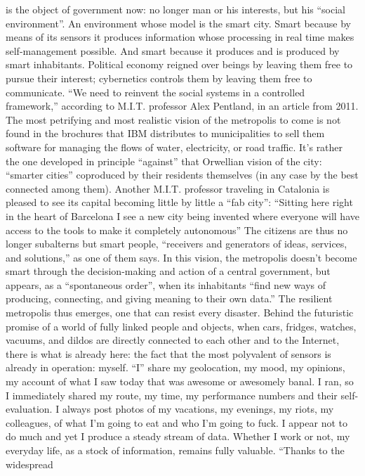\documentclass[landscape,twocolumn,letterpaper]{article}
\begin{document}
is the object of government now: no longer man or his interests, but
his “social environment”. An environment whose model is the smart
city. Smart because by means of its sensors it produces information
whose processing in real time makes self-management possible. And
smart because it produces and is produced by smart
inhabitants. Political economy reigned over beings by leaving them
free to pursue their interest; cybernetics controls them by leaving
them free to communicate. “We need to reinvent the social systems in a
controlled framework,” according to M.I.T. professor Alex Pentland, in
an article from 2011. The most petrifying and most realistic vision of
the metropolis to come is not found in the brochures that IBM
distributes to municipalities to sell them software for managing the
flows of water, electricity, or road traffic. It’s rather the one
developed in principle “against” that Orwellian vision of the city:
“smarter cities” coproduced by their residents themselves (in any case
by the best connected among them). Another M.I.T. professor traveling
in Catalonia is pleased to see its capital becoming little by little a
“fab city”: “Sitting here right in the heart of Barcelona I see a new
city being invented where everyone will have access to the tools to
make it completely autonomous” The citizens are thus no longer
subalterns but smart people, “receivers and generators of ideas,
services, and solutions,” as one of them says. In this vision, the
metropolis doesn’t become smart through the decision-making and action
of a central government, but appears, as a “spontaneous order”, when
its inhabitants “find new ways of producing, connecting, and giving
meaning to their own data.” The resilient metropolis thus emerges, one
that can resist every disaster. Behind the futuristic promise of a
world of fully linked people and objects, when cars, fridges, watches,
vacuums, and dildos are directly connected to each other and to the
Internet, there is what is already here: the fact that the most
polyvalent of sensors is already in operation: myself. “I” share my
geolocation, my mood, my opinions, my account of what I saw today that
was awesome or awesomely banal. I ran, so I immediately shared my
route, my time, my performance numbers and their self-evaluation. I
always post photos of my vacations, my evenings, my riots, my
colleagues, of what I’m going to eat and who I’m going to fuck. I
appear not to do much and yet I produce a steady stream of
data. Whether I work or not, my everyday life, as a stock of
information, remains fully valuable. “Thanks to the widespread
\end{document}
